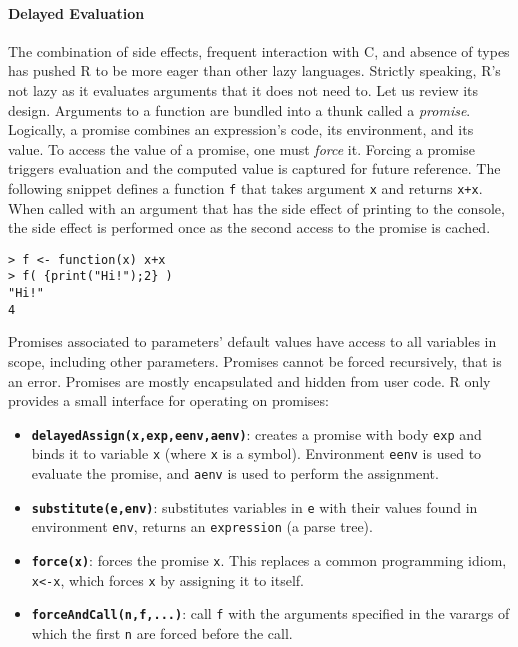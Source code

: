 \documentclass[review,nonacm,screen,acmsmall,anonymous=true]{acmart}
\newcommand{\code}[1]{\lstinline |#1|\xspace}
\begin{document}
\paragraph{Delayed Evaluation}

The combination of side effects, frequent interaction with C, and absence of
types has pushed R to be more eager than other lazy languages. Strictly
speaking, R's not lazy as it evaluates arguments that it does not need to. Let
us review its design. Arguments to a function are bundled into a thunk called a
\emph{promise}. Logically, a promise combines an expression's code, its
environment, and its value. To access the value of a promise, one must
\emph{force} it. Forcing a promise triggers evaluation and the computed value is
captured for future reference. The following snippet defines a function \code{f}
that takes argument \code x and returns \code{x+x}. When called with an argument
that has the side effect of printing to the console, the side effect is
performed once as the second access to the promise is cached.
\begin{lstlisting}
> f <- function(x) x+x
> f( {print("Hi!");2} )
"Hi!"
4
\end{lstlisting}

\noindent
Promises associated to parameters' default values have access to all variables
in scope, including other parameters. Promises cannot be forced recursively,
that is an error. Promises are mostly encapsulated and hidden from user code. R
only provides a small interface for operating on promises:
\begin{itemize}
\item {\bf\small\code{delayedAssign(x,exp,eenv,aenv)}}: creates a promise
  with body \code{exp} and binds it to variable \code x (where \code x is a
  symbol). Environment \code{eenv} is used to evaluate the promise, and
  \code{aenv} is used to perform the assignment.
\item {\bf\small\code{substitute(e,env)}}: substitutes variables in \code e
  with their values found in environment \code{env}, returns an
  \code{expression} (a parse tree).
\item {\bf\small\code{force(x)}}: forces the promise \code x. This replaces a
  common programming idiom, \code{x<-x}, which forces \code x by assigning it
  to itself.
\item {\bf\small\code{forceAndCall(n,f,...)}}: call \code{f} with the
  arguments specified in the varargs of which the first \code{n} are forced
  before the call.
\end{itemize}
\end{document}
